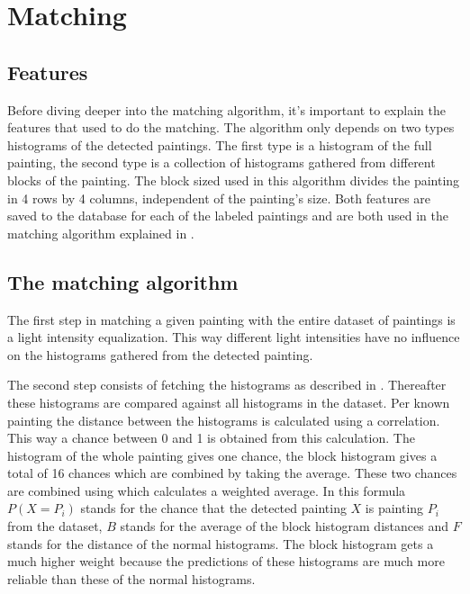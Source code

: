 \section{Matching}
\label{sec:matching}

\subsection{Features}
\label{subsec:the-features}

Before diving deeper into the matching algorithm, it's important to explain the features that used to do the matching. The algorithm only depends on two types histograms of the detected paintings. The first type is a histogram of the full painting, the second type is a collection of histograms gathered from different blocks of the painting. The block sized used in this algorithm divides the painting in 4 rows by 4 columns, independent of the painting's size. Both features are saved to the database for each of the labeled paintings and are both used in the matching algorithm explained in .

\subsection{The matching algorithm}
\label{subsec:matching-algo}

The first step in matching a given painting with the entire dataset of paintings is a light intensity equalization. This way different light intensities have no influence on the histograms gathered from the detected painting.

The second step consists of fetching the histograms as described in . Thereafter these histograms are compared against all histograms in the dataset. Per known painting the distance between the histograms is calculated using a correlation. This way a chance between 0 and 1 is obtained from this calculation. The histogram of the whole painting gives one chance, the block histogram gives a total of 16 chances which are combined by taking the average. These two chances are combined using  which calculates a weighted average. In this formula $P(X = P_{i})$ stands for the chance that the detected painting $X$ is painting $P_{i}$ from the dataset, $B$ stands for the average of the block histogram distances and $F$ stands for the distance of the normal histograms. The block histogram gets a much higher weight because the predictions of these histograms are much more reliable than these of the normal histograms.

